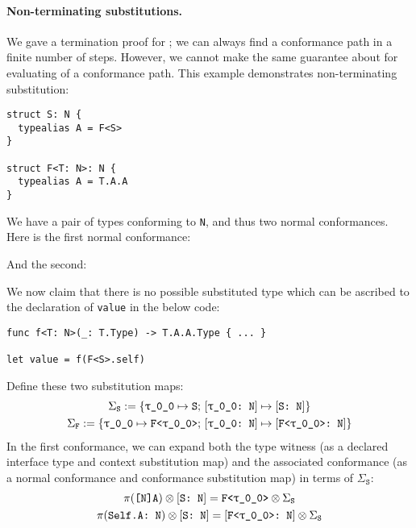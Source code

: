 \documentclass[../generics]{subfiles}
\begin{document}
\paragraph{Non-terminating substitutions.}
We gave a termination proof for ; we can always find a conformance path in a finite number of steps. However, we cannot make the same guarantee about  for evaluating of a conformance path.  This example demonstrates non-terminating substitution:
\begin{Verbatim}
struct S: N {
  typealias A = F<S>
}

struct F<T: N>: N {
  typealias A = T.A.A
}
\end{Verbatim}
We have a pair of types conforming to \texttt{N}, and thus two normal conformances. Here is the first normal conformance:
\begin{quote}
\end{quote}
And the second:
\begin{quote}
\end{quote}
We now claim that there is no possible substituted type which can be ascribed to the declaration of \texttt{value} in the below code:
\begin{Verbatim}
func f<T: N>(_: T.Type) -> T.A.A.Type { ... }

let value = f(F<S>.self)
\end{Verbatim}
Define these two substitution maps:
\begin{gather*} \Sigma_\texttt{S}:=\SubstMapC{\SubstType{\ttgp{0}{0}}{S}}{\SubstConf{\ttgp{0}{0}}{S}{N}}\\
\Sigma_\texttt{F} := \SubstMapC{\SubstType{\ttgp{0}{0}}{F<\ttgp{0}{0}>}}{\SubstConf{\ttgp{0}{0}}{F<\ttgp{0}{0}>}{N}}
\end{gather*}
In the first conformance, we can expand both the type witness (as a declared interface type and context substitution map) and the associated conformance (as a normal conformance and conformance substitution map) in terms of $\Sigma_\texttt{S}$:
\begin{gather*}
\AssocType{[N]A} \otimes \ConfReq{S}{N} = \texttt{F<\ttgp{0}{0}>}\otimes \Sigma_\texttt{S}\\
\SelfAToN \otimes \ConfReq{S}{N} = \ConfReq{F<\ttgp{0}{0}>}{N}\otimes \Sigma_\texttt{S}
\end{gather*}
\end{document}
